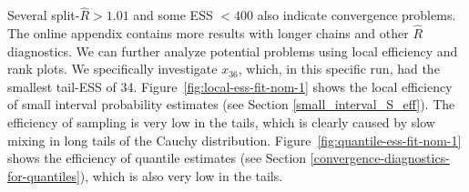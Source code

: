 \documentclass[american,]{article}
\begin{document}


Several split-\(\widehat{R}>1.01\) and some ESS \(<400\)
also indicate convergence problems. The online appendix contains more results 
with longer chains and other \(\widehat{R}\) diagnostics.
%
We can further analyze potential problems using local efficiency and
rank plots. We specifically investigate \(x_{36}\), which, in this
specific run, had the smallest tail-ESS of 34. 
Figure~\ref{fig:local-ess-fit-nom-1} shows the local efficiency of small 
interval probability estimates (see Section \ref{small_interval_S_eff}).
The efficiency of sampling is very low in the tails, which is clearly
caused by slow mixing in long tails of the Cauchy distribution.  
%
Figure~\ref{fig:quantile-ess-fit-nom-1} shows the efficiency
of quantile estimates (see Section \ref{convergence-diagnostics-for-quantiles}), 
which is also very low in the tails. 
\end{document}
